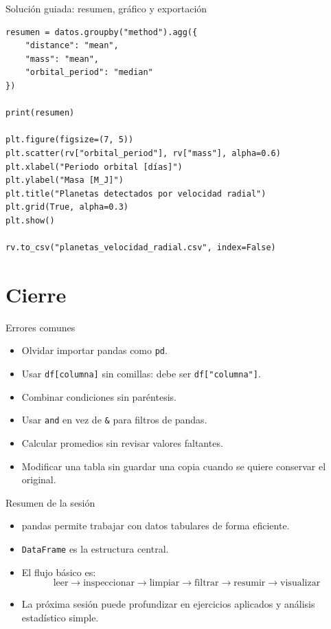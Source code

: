 \documentclass[10pt]{beamer}
\begin{document}
\begin{frame}[fragile,shrink=5]{Solución guiada: resumen, gráfico y exportación}
\begin{verbatim}
resumen = datos.groupby("method").agg({
    "distance": "mean",
    "mass": "mean",
    "orbital_period": "median"
})

print(resumen)

plt.figure(figsize=(7, 5))
plt.scatter(rv["orbital_period"], rv["mass"], alpha=0.6)
plt.xlabel("Periodo orbital [días]")
plt.ylabel("Masa [M_J]")
plt.title("Planetas detectados por velocidad radial")
plt.grid(True, alpha=0.3)
plt.show()

rv.to_csv("planetas_velocidad_radial.csv", index=False)
\end{verbatim}
\end{frame}

\section{Cierre}

\begin{frame}{Errores comunes}
  \begin{itemize}
    \item Olvidar importar pandas como \texttt{pd}.
    \item Usar \texttt{df[columna]} sin comillas: debe ser \texttt{df["columna"]}.
    \item Combinar condiciones sin paréntesis.
    \item Usar \texttt{and} en vez de \texttt{\&} para filtros de pandas.
    \item Calcular promedios sin revisar valores faltantes.
    \item Modificar una tabla sin guardar una copia cuando se quiere conservar el original.
  \end{itemize}
\end{frame}

\begin{frame}{Resumen de la sesión}
  \begin{itemize}
    \item pandas permite trabajar con datos tabulares de forma eficiente.
    \item \texttt{DataFrame} es la estructura central.
    \item El flujo básico es:
      \[
      \text{leer} \rightarrow \text{inspeccionar} \rightarrow \text{limpiar} \rightarrow \text{filtrar} \rightarrow \text{resumir} \rightarrow \text{visualizar}
      \]
    \item La próxima sesión puede profundizar en ejercicios aplicados y análisis estadístico simple.
  \end{itemize}
\end{frame}
\end{document}
